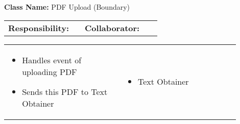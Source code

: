 \begin{cards}[]
    \textbf{Class Name:} PDF Upload (Boundary)
    \tcbline
    \begin{tabular}{p{0.45\linewidth} | p{0.45\linewidth}}
        \textbf{Responsibility:}& 
        \textbf{Collaborator:}\\
    \end{tabular}
    \tcbline
    \begin{tabular}{p{0.45\linewidth} | p{0.45\linewidth}}
        \begin{itemize}
            \item Handles event of uploading PDF
            \item Sends this PDF to Text Obtainer
        \end{itemize}
        &
        \begin{itemize}
            \item Text Obtainer
        \end{itemize}
    \end{tabular}
\end{cards}